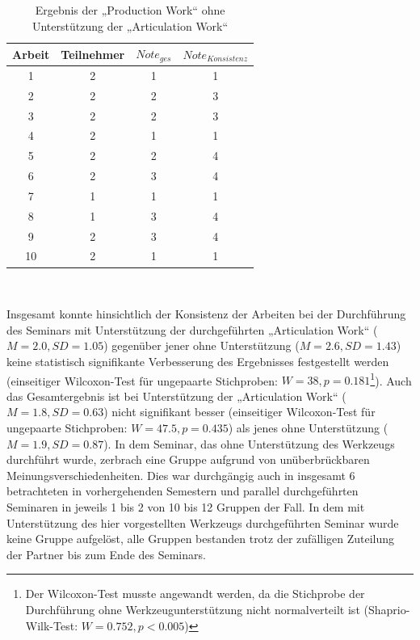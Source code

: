 \begin{table}[htbp]
	\centering
	\caption{Ergebnis der „Production Work“ ohne Unterstützung der „Articulation Work“}

\begin{tabular}{| c || c || c | c |}
  \hline
   Arbeit & Teilnehmer & $Note_{ges}$ & $Note_{Konsistenz}$ \\ \hline
   1         & 2 & 1 & 1 \\ 
   2         & 2 & 2 & 3 \\ 
   3         & 2 & 2 & 3 \\ 
   4         & 2 & 1 & 1 \\ 
   5         & 2 & 2 & 4 \\ 
   6         & 2 & 3 & 4 \\ 
   7         & 1 & 1 & 1 \\ 
   8         & 1 & 3 & 4 \\ 
   9         & 2 & 3 & 4 \\ 
   10        & 2 & 1 & 1 \\ \hline
\end{tabular} \\ 
	\label{tab:ergebnis_ohne}
\end{table}

Insgesamt konnte hinsichtlich der Konsistenz der Arbeiten bei der Durchführung des Seminars mit Unterstützung der durchgeführten „Articulation Work“ ($M=2.0, SD=1.05$) gegenüber jener ohne Unterstützung ($M=2.6, SD=1.43$) keine statistisch signifikante Verbesserung des Ergebnisses festgestellt werden (einseitiger Wilcoxon-Test für ungepaarte Stichproben: $W=38, p=0.181$\footnote{Der Wilcoxon-Test musste angewandt werden, da die Stichprobe der Durchführung ohne Werkzeugunterstützung nicht normalverteilt ist (Shaprio-Wilk-Test: $W=0.752, p<0.005$)}). Auch das Gesamtergebnis ist bei Unterstützung der „Articulation Work“ ($M=1.8, SD=0.63$) nicht signifikant besser (einseitiger Wilcoxon-Test für ungepaarte Stichproben: $W=47.5, p=0.435$) als jenes ohne Unterstützung ($M=1.9, SD=0.87$). In dem Seminar, das ohne Unterstützung des Werkzeugs durchführt wurde, zerbrach eine Gruppe aufgrund von unüberbrückbaren Meinungsverschiedenheiten. Dies war durchgängig auch in insgesamt 6 betrachteten in vorhergehenden Semestern und parallel durchgeführten Seminaren in jeweils 1 bis 2 von 10 bis 12 Gruppen der Fall. In dem mit Unterstützung des hier vorgestellten Werkzeugs durchgeführten Seminar wurde keine Gruppe aufgelöst, alle Gruppen bestanden trotz der zufälligen Zuteilung der Partner bis zum Ende des Seminars.

